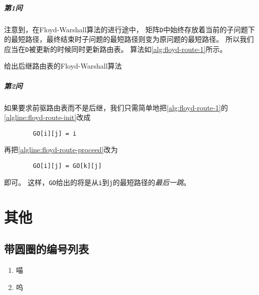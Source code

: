 \documentclass{dreamClass}
\begin{document}
\subparagraph*{第1问}
注意到，在Floyd-Warshall算法的进行途中，
矩阵\texttt{D}中始终存放着当前的子问题下的最短路径，最终结束时子问题的最短路径则变为原问题的最短路径。
所以我们应当在\texttt{D}被更新的时候同时更新路由表。
算法如\cref{alg:floyd-route-1}所示。

\begin{algorithm}
    \caption{给出后继路由表的Floyd-Warshall算法}\label{alg:floyd-route-1}
    \Indm
    \Indp

     {
         {
             {
            }
        }
    }
\end{algorithm}
\subparagraph*{第2问}
如果要求前驱路由表而不是后继，我们只需简单地把\cref{alg:floyd-route-1}的\cref{algline:floyd-route-init}改成
\begin{codeblock}
    \begin{verbatim}
        GO[i][j] = i
    \end{verbatim}
\end{codeblock}
再把\cref{algline:floyd-route-proceed}改为
\begin{codeblock}
    \begin{verbatim}
        GO[i][j] = GO[k][j]
    \end{verbatim}
\end{codeblock}
即可。
这样，\texttt{GO}给出的将是从\texttt{i}到\texttt{j}的最短路径的\emph{最后一跳}。

\section{其他}
\subsection{带圆圈的编号列表}
\begin{enumerate}[label=\large\protect\textcircled{\small\arabic*}]
    \item 喵
    \item 呜
\end{enumerate}
\end{document}
